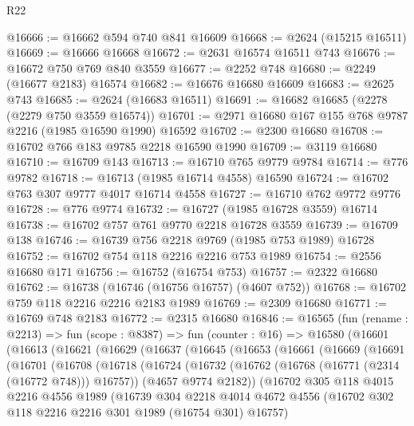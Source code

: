 \begin{lexlean}{R22}
\begin{coremodule}
@16666 := @16662 @594 @740 @841 @16609
@16668 := @2624 (@15215 @16511)
@16669 := @16666 @16668
@16672 := @2631 @16574 @16511 @743
@16676 := @16672 @750 @769 @840 @3559
@16677 := @2252 @748
@16680 := @2249 (@16677 @2183) @16574
@16682 := @16676 @16680 @16609
@16683 := @2625 @743
@16685 := @2624 (@16683 @16511)
@16691 := @16682 @16685 (@2278 (@2279 @750 @3559 @16574))
@16701 := @2971 @16680 @167 @155 @768 @9787 @2216 (@1985 @16590 @1990) @16592
@16702 := @2300 @16680
@16708 := @16702 @766 @183 @9785 @2218 @16590 @1990
@16709 := @3119 @16680
@16710 := @16709 @143
@16713 := @16710 @765 @9779 @9784
@16714 := @776 @9782
@16718 := @16713 (@1985 @16714 @4558) @16590
@16724 := @16702 @763 @307 @9777 @4017 @16714 @4558
@16727 := @16710 @762 @9772 @9776
@16728 := @776 @9774
@16732 := @16727 (@1985 @16728 @3559) @16714
@16738 := @16702 @757 @761 @9770 @2218 @16728 @3559
@16739 := @16709 @138
@16746 := @16739 @756 @2218 @9769 (@1985 @753 @1989) @16728
@16752 := @16702 @754 @118 @2216 @2216 @753 @1989
@16754 := @2556 @16680 @171
@16756 := @16752 (@16754 @753)
@16757 := @2322 @16680
@16762 := @16738 (@16746 (@16756 @16757) (@4607 @752))
@16768 := @16702 @759 @118 @2216 @2216 @2183 @1989
@16769 := @2309 @16680
@16771 := @16769 @748 @2183
@16772 := @2315 @16680
@16846 := @16565
    (fun (rename : @2213) =>
    fun (scope : @8387) =>
    fun (counter : @16) =>
    @16580
      (@16601
        (@16613
          (@16621
            (@16629
              (@16637
                (@16645
                  (@16653
                    (@16661
                      (@16669
                        (@16691
                          (@16701
                            (@16708
                              (@16718
                                (@16724
                                  (@16732
                                    (@16762 (@16768 (@16771 (@2314 (@16772 @748))) @16757))
                                    (@4657 @9774 @2182))
                                  (@16702
                                    @305
                                    @118
                                    @4015
                                    @2216
                                    @4556
                                    @1989
                                    (@16739
                                      @304
                                      @2218
                                      @4014
                                      @4672
                                      @4556
                                      (@16702 @302 @118 @2216 @2216 @301 @1989 (@16754 @301) @16757)

\end{coremodule}
\end{lexlean}
